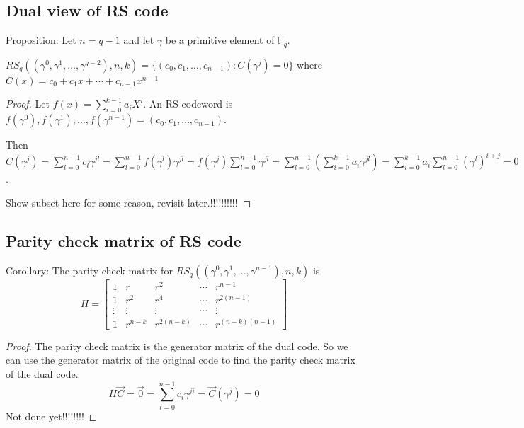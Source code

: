 \documentclass[letterpaper,12pt]{article}
\begin{document}
\subsection{Dual view of RS code}
Proposition: Let $n=q-1$ and let $\gamma$ be a primitive element of
$\mathbb{F}_q$.

$RS_q ((\gamma^0,\gamma^1,\ldots,\gamma^{q-2}),n,k) = \{(c_0,c_1,\ldots,c_{n-1}):C(\gamma^j)=0\}$ where $C(x)=c_0+c_1x+\cdots+c_{n-1}x^{n-1}$

\begin{proof}
    Let $f(x)=\sum_{i=0}^{k-1}a_i X^i$. An RS codeword is $f(\gamma^0),f(\gamma^1),\ldots,f(\gamma^{n-1}) = (c_0,c_1,\ldots,c_{n-1})$.

    Then $C(\gamma^j)=\sum_{l=0}^{n-1}c_l \gamma^{jl} =
        \sum_{l=0}^{n-1}f(\gamma^l)\gamma^{jl} = f(\gamma^j)\sum_{l=0}^{n-1}\gamma^{jl}
        = \sum_{l=0}^{n-1}(\sum_{i=0}^{k-1}a_i \gamma^{jl})= \sum_{i=0}^{k-1}a_i
        \sum_{l=0}^{n-1}(\gamma^{l})^{i+j} = 0$.

    Show subset here for some reason, revisit later.!!!!!!!!!!
\end{proof}
\subsection{Parity check matrix of RS code}
Corollary: The parity check matrix for
$RS_q((\gamma^0,\gamma^1,\ldots,\gamma^{n-1}),n,k)$ is \[
    H=\begin{bmatrix}
        1      & r       & r^2        & \cdots & r^{n-1}        \\
        1      & r^2     & r^4        & \cdots & r^{2(n-1)}     \\
        \vdots & \vdots  & \vdots     & \cdots & \vdots         \\
        1      & r^{n-k} & r^{2(n-k)} & \cdots & r^{(n-k)(n-1)}
    \end{bmatrix}
\]
\begin{proof}
    The parity check matrix is the generator matrix of the dual code. So we can use the generator matrix of the original code to find the parity check matrix of the dual code.
    \[
        H\vec{C}=\vec{0}=\sum_{i=0}^{n-1}c_i\gamma^{ji}=\vec{C}(\gamma^j)=0
    \]
    Not done yet!!!!!!!!
\end{proof}
\end{document}
